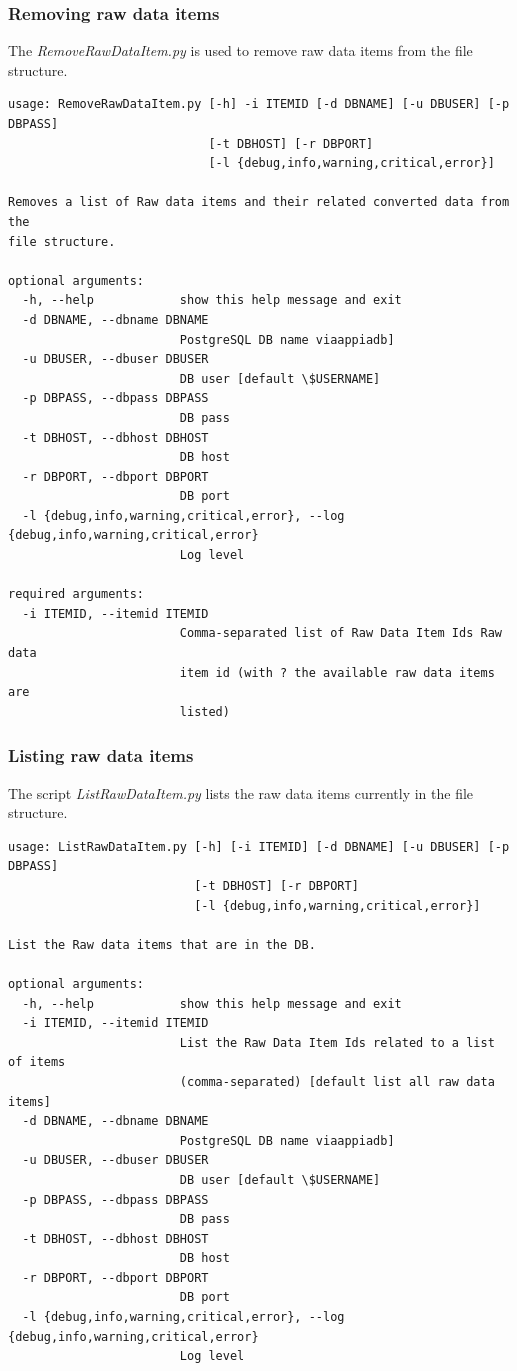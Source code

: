 \subsubsection{Removing raw data items}
\label{sec:removeraw} 
The \textit{RemoveRawDataItem.py} is used to remove raw data items from the file
structure. 
\begin{Verbatim}[fontfamily=courier,commandchars=\\\{\},fontsize=\footnotesize]
usage: RemoveRawDataItem.py [-h] -i ITEMID [-d DBNAME] [-u DBUSER] [-p DBPASS]
                            [-t DBHOST] [-r DBPORT]
                            [-l {debug,info,warning,critical,error}]

Removes a list of Raw data items and their related converted data from the
file structure.

optional arguments:
  -h, --help            show this help message and exit
  -d DBNAME, --dbname DBNAME
                        PostgreSQL DB name viaappiadb]
  -u DBUSER, --dbuser DBUSER
                        DB user [default \$USERNAME]
  -p DBPASS, --dbpass DBPASS
                        DB pass
  -t DBHOST, --dbhost DBHOST
                        DB host
  -r DBPORT, --dbport DBPORT
                        DB port
  -l {debug,info,warning,critical,error}, --log {debug,info,warning,critical,error}
                        Log level

required arguments:
  -i ITEMID, --itemid ITEMID
                        Comma-separated list of Raw Data Item Ids Raw data
                        item id (with ? the available raw data items are
                        listed)
\end{Verbatim}

\subsubsection{Listing raw data items}
\label{sec:listraw} 
The script \textit{ListRawDataItem.py} lists the raw data items currently in the
file structure.
\begin{Verbatim}[fontfamily=courier,commandchars=\\\{\},fontsize=\footnotesize]
usage: ListRawDataItem.py [-h] [-i ITEMID] [-d DBNAME] [-u DBUSER] [-p DBPASS]
                          [-t DBHOST] [-r DBPORT]
                          [-l {debug,info,warning,critical,error}]

List the Raw data items that are in the DB.

optional arguments:
  -h, --help            show this help message and exit
  -i ITEMID, --itemid ITEMID
                        List the Raw Data Item Ids related to a list of items
                        (comma-separated) [default list all raw data items]
  -d DBNAME, --dbname DBNAME
                        PostgreSQL DB name viaappiadb]
  -u DBUSER, --dbuser DBUSER
                        DB user [default \$USERNAME]
  -p DBPASS, --dbpass DBPASS
                        DB pass
  -t DBHOST, --dbhost DBHOST
                        DB host
  -r DBPORT, --dbport DBPORT
                        DB port
  -l {debug,info,warning,critical,error}, --log {debug,info,warning,critical,error}
                        Log level
\end{Verbatim}

